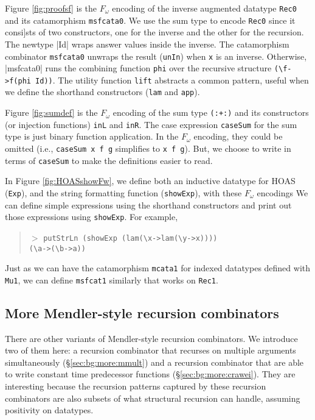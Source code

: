 \documentclass[letterpaper,12pt]{article}
\begin{document}
Figure \ref{fig:proofsf} is the $F_\omega$ encoding of the inverse augmented datatype
\verb|Rec0| and its catamorphism \verb|msfcata0|.  We use the sum type to encode \verb|Rec0|
since it consi]sts of two constructors, one for the inverse and the other for
the recursion.  The newtype |Id| wraps answer values inside the inverse.
The catamorphism combinator \verb|msfcata0| unwraps
the result (\verb|unIn|) when \verb|x| is an inverse.  Otherwise, |msfcata0| runs the
combining function \verb|phi| over the recursive structure \verb|(\f->f(phi Id))|.
The utility function \verb|lift| abstracts a common pattern, useful
when we define the shorthand constructors (\verb|lam| and \verb|app|).

Figure \ref{fig:sumdef} is the $F_\omega$ encoding of the sum type \verb|(:+:)|
and its constructors (or injection functions) \verb|inL| and \verb|inR|.
The case expression \verb|caseSum| for the sum type is just binary function
application. In the $F_\omega$ encoding, they could be omitted
(i.e., \verb|caseSum x f g| simplifies to \verb|x f g|).  But, we choose to write
in terms of \verb|caseSum| to make the definitions easier to read.

In Figure \ref{fig:HOASshowFw}, we define both an inductive datatype for HOAS (\verb|Exp|), and the string formatting function
(\verb|showExp|),
with these $F_\omega$ encodings
We can define simple expressions using the shorthand constructors and print out
those expressions using \verb|showExp|.  For example,
\begin{quote}\noindent
$>$ \verb|putStrLn (showExp (lam(\x->lam(\y->x))))|\\
\verb|(\a->(\b->a))|
\end{quote}


Just as we can have the catamorphism \verb|mcata1| for indexed datatypes
defined with \verb|Mu1|, we can define \verb|msfcat1| similarly that works
on \verb|Rec1|.

\subsection{More Mendler-style recursion combinators} \label{sec:bg:more}
There are other variants of Mendler-style recursion combinators.
We introduce two of them here: a recursion combinator that recurses
on multiple arguments simultaneously (\S\ref{sec:bg:more:mmult})
and a recursion combinator that are able to write constant time predecessor functions (\S\ref{sec:bg:more:crawei}).
They are interesting because the recursion patterns captured by
these recursion combinators are also subsets of what structural recursion
can handle, assuming positivity on datatypes.
\end{document}
